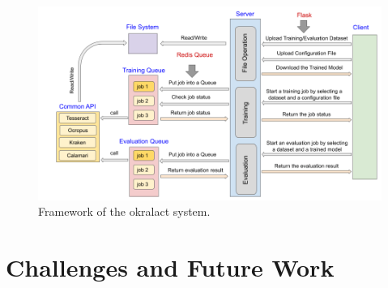 \documentclass[conference]{IEEEtran}
\begin{document}
\begin{figure}[ht!]
        \begin{center}
     \includegraphics[width=0.8\linewidth]{Figures/Framework.png}
        \end{center}
        \caption{\small{Framework of the okralact system.}}
\label{fig:framework}
\end{figure}

\section*{Challenges and Future Work}






\end{document}
